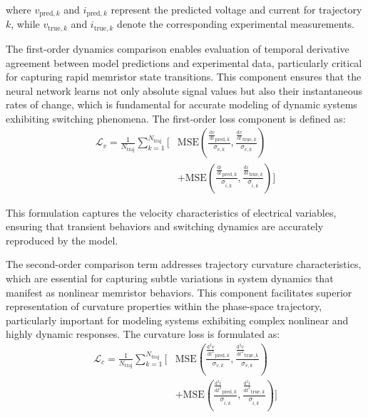 \documentclass[lettersize,journal]{IEEEtran}
\begin{document}
where \(v_{\mathrm{pred},k}\) and \(i_{\mathrm{pred},k}\) represent the predicted voltage and current for trajectory \(k\), while \(v_{\mathrm{true},k}\) and \(i_{\mathrm{true},k}\) denote the corresponding experimental measurements.


The first-order dynamics comparison enables evaluation of temporal derivative agreement between model predictions and experimental data, particularly critical for capturing rapid memristor state transitions. This component ensures that the neural network learns not only absolute signal values but also their instantaneous rates of change, which is fundamental for accurate modeling of dynamic systems exhibiting switching phenomena. The first-order loss component is defined as:
\begin{equation}
  \begin{split}
    \mathcal{L}_{v} = \frac{1}{N_{\text{traj}}} \sum_{k=1}^{N_{\text{traj}}} \Bigg[ & \mathrm{MSE}\left(\frac{\tfrac{\mathrm{d}v}{\mathrm{d}t}_{\mathrm{pred},k}}{\sigma_{\dot{v},k}}, \frac{\tfrac{\mathrm{d}v}{\mathrm{d}t}_{\mathrm{true},k}}{\sigma_{\dot{v},k}}\right)          \\
                                                                                    & + \mathrm{MSE}\left(\frac{\tfrac{\mathrm{d}i}{\mathrm{d}t}_{\mathrm{pred},k}}{\sigma_{\dot{i},k}}, \frac{\tfrac{\mathrm{d}i}{\mathrm{d}t}_{\mathrm{true},k}}{\sigma_{\dot{i},k}}\right) \Bigg]
  \end{split}
  \label{eq:loss_v}
\end{equation}


This formulation captures the velocity characteristics of electrical variables, ensuring that transient behaviors and switching dynamics are accurately reproduced by the model.

The second-order comparison term addresses trajectory curvature characteristics, which are essential for capturing subtle variations in system dynamics that manifest as nonlinear memristor behaviors. This component facilitates superior representation of curvature properties within the phase-space trajectory, particularly important for modeling systems exhibiting complex nonlinear and highly dynamic responses. The curvature loss is formulated as:
\begin{equation}
  \begin{split}
    \mathcal{L}_{c} = \frac{1}{N_{\text{traj}}} \sum_{k=1}^{N_{\text{traj}}} \Bigg[ & \mathrm{MSE}\left(\frac{\tfrac{\mathrm{d}^2 v}{\mathrm{d}t^2}_{\mathrm{pred},k}}{\sigma_{\ddot{v},k}}, \frac{\tfrac{\mathrm{d}^2 v}{\mathrm{d}t^2}_{\mathrm{true},k}}{\sigma_{\ddot{v},k}}\right)          \\
                                                                                    & + \mathrm{MSE}\left(\frac{\tfrac{\mathrm{d}^2 i}{\mathrm{d}t^2}_{\mathrm{pred},k}}{\sigma_{\ddot{i},k}}, \frac{\tfrac{\mathrm{d}^2 i}{\mathrm{d}t^2}_{\mathrm{true},k}}{\sigma_{\ddot{i},k}}\right) \Bigg]
  \end{split}
  \label{eq:loss_c}
\end{equation}
\end{document}

